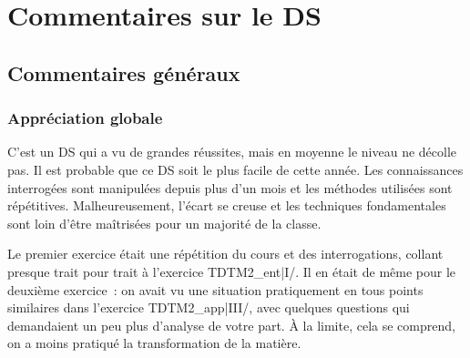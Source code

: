 \documentclass[a4paper, 10pt, final, garamond]{book}
\begin{document}
\setcounter{chapter}{2}

\def\lspace{25}

\chapter{Commentaires sur le DS }

\section{Commentaires généraux}
\subsection{Appréciation globale}

C'est un DS qui a vu de grandes réussites, mais en moyenne le niveau ne décolle
pas. Il est probable que ce DS soit le plus facile de cette année. Les
connaissances interrogées sont manipulées depuis plus d'un mois et les méthodes
utilisées sont répétitives. Malheureusement, l'écart se creuse et les techniques
fondamentales sont loin d'être maîtrisées pour un majorité de la classe.

Le premier exercice était une répétition du cours et des interrogations, collant
presque trait pour trait à l'exercice TDTM2\_ent|I/. Il en était de même pour le
deuxième exercice~: on avait vu une situation pratiquement en tous points
similaires dans l'exercice TDTM2\_app|III/, avec quelques questions qui
demandaient un peu plus d'analyse de votre part. À la limite, cela se comprend,
on a moins pratiqué la transformation de la matière.
\end{document}
